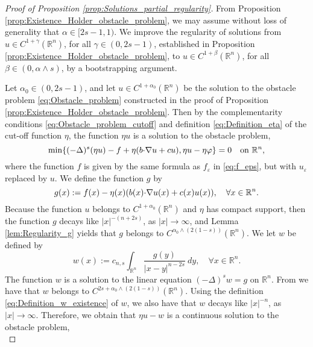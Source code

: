 \documentclass[11pt,reqno]{amsart}
\theoremstyle{definition}
\theoremstyle{remark}
\begin{document}
\begin{proof}[Proof of Proposition \ref{prop:Solutions_partial_regularity}]
From Proposition \ref{prop:Existence_Holder_obstacle_problem}, we may assume without loss of generality that $\alpha \in [2s-1,1)$.
We improve the regularity of solutions from $u\in C^{1+\gamma}({\mathbb{R}}^n)$, for all $\gamma\in (0,2s-1)$, established in Proposition \ref{prop:Existence_Holder_obstacle_problem}, to  $u\in C^{1+\beta}({\mathbb{R}}^n)$, for all $\beta\in (0,\alpha\wedge s)$, by a bootstrapping argument.

Let $\alpha_0\in (0,2s-1)$, and let $u\in C^{1+\alpha_0}({\mathbb{R}}^n)$ be the solution to the obstacle problem \eqref{eq:Obstacle_problem} constructed in the proof of Proposition \ref{prop:Existence_Holder_obstacle_problem}. Then by the complementarity conditions \eqref{eq:Obstacle_problem_cutoff} and definition \eqref{eq:Definition_eta} of the cut-off function $\eta$, the function $\eta u$ is a solution to the obstacle problem,
$$
\min\{(-\Delta)^s (\eta u) - f + \eta(b{\hbox{$\cdot$}}\nabla u+c u), \eta u-\eta\varphi\}=0\quad\hbox{on } {\mathbb{R}}^n,
$$
where the function $f$ is given by the same formula as $f_{\varepsilon}$ in \eqref{eq:f_eps}, but with $u_{\varepsilon}$ replaced by $u$. We define the function $g$ by
\begin{equation}
\label{eq:Definition_g} 
g(x):=f(x)-\eta(x)(b(x){\hbox{$\cdot$}}\nabla u(x)+c(x) u(x)),\quad\forall x\in {\mathbb{R}}^n.
\end{equation}
Because the function $u$ belongs to $C^{1+\alpha_0}({\mathbb{R}}^n)$ and $\eta$ has compact support, then the function $g$ decays like $|x|^{-(n+2s)}$, as $|x|\rightarrow\infty$, and Lemma \ref{lem:Regularity_g} yields that $g$ belongs to $C^{\alpha_0\wedge (2(1-s))}({\mathbb{R}}^n)$. We let $w$ be defined by
\begin{equation}
\label{eq:Definition_w_existence}
w(x):=c_{n,s} \int_{{\mathbb{R}}^n}\frac{g(y)}{|x-y|^{n-2s}}\ dy,\quad\forall x\in {\mathbb{R}}^n.
\end{equation}
The function $w$ is a solution to the linear equation $(-\Delta)^s w = g$ on ${\mathbb{R}}^n$. From \cite[Proposition 2.8]{Silvestre_2007} we have that $w$ belongs to $C^{2s+\alpha_0\wedge (2(1-s))}({\mathbb{R}}^n)$. Using the definition \eqref{eq:Definition_w_existence} of $w$, we also have that $w$ decays like $|x|^{-n}$, as $|x|\rightarrow\infty$. Therefore, we obtain that $\eta u-w$ is a continuous solution to the obstacle problem,
\begin{equation}

\end{equation}
\end{proof}
\end{document}
